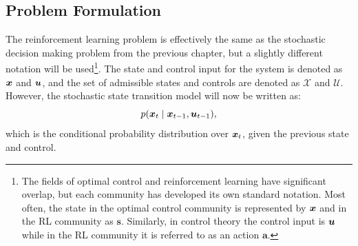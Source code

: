 \subsection{Problem Formulation}
The reinforcement learning problem is effectively the same as the stochastic decision making problem from the previous chapter, but a slightly different notation will be used\footnote{The fields of optimal control and reinforcement learning have significant overlap, but each community has developed its own standard notation. Most often, the state in the optimal control community is represented by $\bm{x}$ and in the RL community as $\bm{s}$. Similarly, in control theory the control input is $\bm{u}$ while in the RL community it is referred to as an action $\bm{a}$.}. The state and control input for the system is denoted as $\bm{x}$ and $\bm{u}$, and the set of admissible states and controls are denoted as $\mathcal{X}$ and $\mathcal{U}$. However, the stochastic state transition model will now be written as:
\begin{equation} \label{eq:RLmodel}
p(\bm{x}_t \mid \bm{x}_{t-1}, \bm{u}_{t-1}),
\end{equation}
which is the conditional probability distribution over $\bm{x}_t$, given the previous state and control. 

